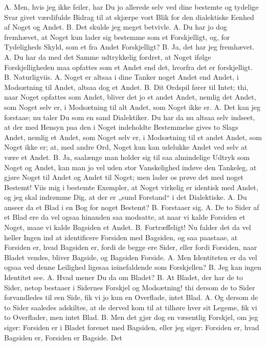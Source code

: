 \documentclass[12pt,a4paper]{book}
\begin{document}
A. Men, hvis jeg ikke feiler, har Du jo allerede selv ved dine bestemte
og tydelige Svar givet værdifulde Bidrag til at skjærpe vort Blik for
den dialektiske Eenhed af Noget og Andet. B. Det skulde jeg meget
betvivle. A. Du har jo dog fremhævet, at Noget kun lader sig bestemme
som et Forskjelligt, og, for Tydeligheds Skyld, som et fra Andet
Forskjelligt? B. Ja, det har jeg fremhævet. A. Du har da med det
Samme udtrykkelig fordret, at Noget ifølge Forskjelligheden maa opfattes
som et Andet end det, hvorfra det er forskjelligt. B. Naturligviis.
A. Noget er altsaa i dine Tanker noget Andet end Andet, i Modsætning
til Andet, altsaa dog et Andet. B. Dit Ordspil fører til Intet; thi,
naar Noget opfattes som Andet, bliver det jo et andet Andet, nemlig det
Andet, som Noget selv er, i Modsætning til alt Andet, som Noget ikke
er. A. Det kan jeg forstaae; nu taler Du som en sand Dialektiker. Du
har da nu altsaa selv indseet, at der med Hensyn paa den i Noget
indeholdte Bestemmelse gives to Slags Andet, nemlig et Andet, som Noget
selv er, i Modsætning til et andet Andet, som Noget ikke er; at, med
andre Ord, Noget kun kan udelukke Andet ved selv at være et Andet.
B. Ja, saalænge man holder sig til saa almindelige Udtryk som Noget og
Andet,
kan man jo vel uden stor Vanskelighed indøve den Tankeleg, at gjøre
Noget til Andet og Andet til Noget; men lader os prøve det med noget
Bestemt! Viis mig i bestemte Exempler, at Noget virkelig er identisk
med Andet, og jeg skal indrømme Dig, at der er „sund Forstand“ i det
Dialektiske. A. Du anseer da et Blad i en Bog for noget Bestemt?
B. Forstaaer sig. A. De to Sider af et Blad ere da vel ogsaa hinanden
saa modsatte, at naar vi kalde Forsiden et Noget, maae vi kalde Bagsiden
et Andet. B. Fortræffeligt! Nu falder det da vel heller Ingen ind at
identificere Forsiden med Bagsiden, og saa paastaae, at Forsiden er,
hvad Bagsiden er, fordi de begge ere Sider, eller fordi Forsiden, naar
Bladet vendes, bliver Bagside, og Bagsiden Forside. A. Men Identiteten
er da vel ogsaa ved denne Leilighed ligesaa iøinefaldende som
Forskjellen? B. Jeg kan ingen Identitet see. A. Hvad mener Du da om
Bladet? B. At Bladet, der har de to Sider, netop bestaaer i Sidernes
Forskjel og Modsætning! thi dersom de to Sider forvandledes til een
Side, fik vi jo kun en Overflade, intet Blad. A. Og dersom de to Sider
saaledes adskiltes, at de derved kom til at tilhøre hver sit Legeme, fik
vi to Overflader, men intet Blad. B. Men det gjør dog en væsentlig
Forskjel, om jeg siger: Forsiden er i Bladet forenet med Bagsiden, eller
jeg siger: Forsiden er, hvad Bagsiden er, Forsiden er Bagside. Det
\end{document}
